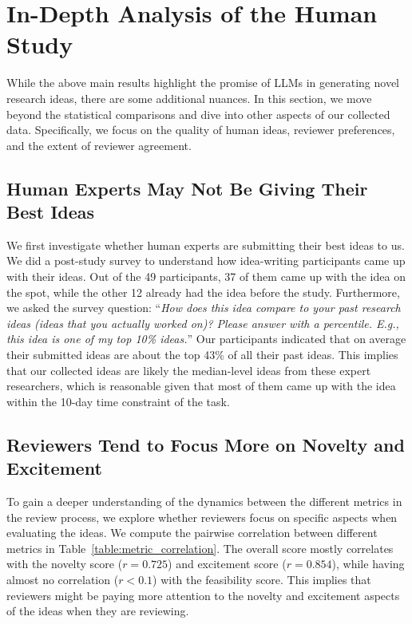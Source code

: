 \section{In-Depth Analysis of the Human Study}
\label{sec:quan_analysis}

While the above main results highlight the promise of LLMs in generating novel research ideas, there are some additional nuances.
In this section, we move beyond the statistical comparisons and dive into other aspects of our collected data. 
Specifically, we focus on the quality of human ideas, reviewer preferences, and the extent of reviewer agreement. 

\subsection{Human Experts May Not Be Giving Their Best Ideas}
We first investigate whether human experts are submitting their best ideas to us. 
We did a post-study survey to understand how idea-writing participants came up with their ideas. Out of the 49 participants, 37 of them came up with the idea on the spot, while the other 12 already had the idea before the study. Furthermore, we asked the survey question: ``\emph{How does this idea compare to your past research ideas (ideas that you actually worked on)? Please answer with a percentile. E.g., this idea is one of my top 10\% ideas.}'' Our participants indicated that on average their submitted ideas are about the top 43\% of all their past ideas. This implies that our collected ideas are likely the median-level ideas from these expert researchers, which is reasonable given that most of them came up with the idea within the 10-day time constraint of the task. 




\subsection{Reviewers Tend to Focus More on Novelty and Excitement}

To gain a deeper understanding of the dynamics between the different metrics in the review process, we explore whether reviewers focus on specific aspects when evaluating the ideas.
We compute the pairwise correlation between different metrics in Table~\ref{table:metric_correlation}. The overall score mostly correlates with the novelty score ($r=0.725$)  and excitement score ($r=0.854$), while having almost no correlation ($r<0.1$) with the feasibility score. This implies that reviewers might be paying more attention to the novelty and excitement aspects of the ideas when they are reviewing. 


